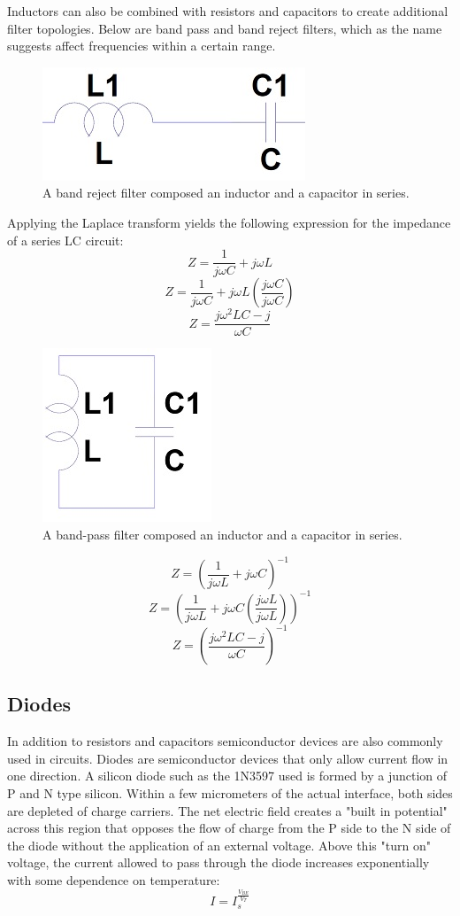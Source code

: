 \documentclass[11pt]{article}
\begin{document}
    
    Inductors can also be combined with resistors and capacitors to create additional filter topologies. Below are band pass and band reject filters, which as the name suggests affect frequencies within a certain range.
    \begin{figure}[h!]
    \centering
    \includegraphics[scale=1.3]{lc_series.jpg}
    \caption{A band reject filter composed an inductor and a capacitor in series.}
    \label{fig:lc_series}
    \end{figure}
    
    Applying the Laplace transform yields the following expression for the impedance of a series LC circuit:
    $$Z = \frac{1}{j\omega C} + j\omega L $$
    $$Z = \frac{1}{j\omega C} + j\omega L \left(\frac{j\omega C}{j\omega C}\right)$$
    $$Z = \frac{j\omega^2 LC-j}{\omega C} $$
    
    \begin{figure}[h!]
    \centering
    \includegraphics[scale=1.7]{lc_parallel.jpg}
    \caption{A band-pass filter composed an inductor and a capacitor in series.}
    \label{fig:lc_parallel}
    \end{figure}
    
    $$Z = \left(\frac{1}{j\omega L} + j\omega C\right)^{-1}$$
    $$Z = \left(\frac{1}{j\omega L} + j\omega C \left(\frac{j\omega L}{j\omega L}\right)\right)^{-1}$$
    $$Z = \left(\frac{j\omega^2 LC-j}{\omega C}\right)^{-1}$$
    
    
  \subsection{Diodes}
  In addition to resistors and capacitors semiconductor devices are also commonly used in circuits. Diodes are semiconductor devices that only allow current flow in one direction.  A silicon diode such as the 1N3597 used is formed by a junction of P and N type silicon.  Within a few micrometers of the actual interface, both sides are depleted of charge carriers. The net electric field creates a "built in potential" across this region that opposes the flow of charge from the P side to the N side of the diode without the application of an external voltage. Above this "turn on" voltage, the current allowed to pass through the diode increases exponentially with some dependence on temperature:
  $$ I = I_s^{\frac{ V_{BE} }{ V_{T} }}$$
  
\end{document}
